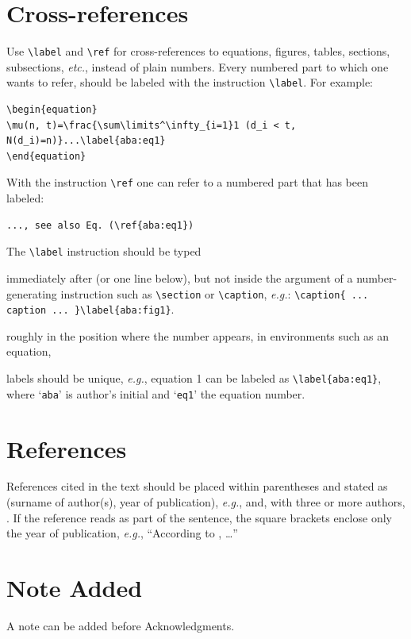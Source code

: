\documentclass{ws-jai}
\begin{document}
\section{Cross-references}
Use \verb|\label| and \verb|\ref| for cross-references to
equations, figures, tables, sections, subsections, {\it etc.}, instead
of plain numbers. Every numbered part to which one wants to refer,
should be labeled with the instruction \verb|\label|.
For example:
\begin{verbatim}
\begin{equation}
\mu(n, t)=\frac{\sum\limits^\infty_{i=1}1 (d_i < t, N(d_i)=n)}...\label{aba:eq1}
\end{equation}
\end{verbatim}
With the instruction \verb|\ref| one can refer to a numbered part
that has been labeled:
\begin{verbatim}
..., see also Eq. (\ref{aba:eq1})
\end{verbatim}

The \verb|\label| instruction should be typed
\begin{itemlist}
\item immediately after (or one line below), but not inside the argument of
a number-generating instruction such as \verb|\section| or \verb|\caption|, {\it e.g.}:
\verb|\caption{ ... caption ... }\label{aba:fig1}|.
\item roughly in the position where the number appears, in environments
such as an equation,
\item labels should be unique, {\it e.g.}, equation 1 can be labeled as
\verb|\label{aba:eq1}|, where `{\tt aba}' is author's initial and
`{\tt eq1}' the equation number.
\end{itemlist}

\section{References}
References cited in the text should be placed within parentheses and stated as (surname of author(s), year of
publication), {\it e.g.}, \cite{Golub89} and, with three
or more authors, \cite{blain02}. If the reference reads as part of
the sentence, the square brackets enclose only the year of
publication, {\it e.g.}, ``According to \citet{Golub89}, \ldots''

\section*{Note Added}
A note can be added before Acknowledgments.
\end{document}
